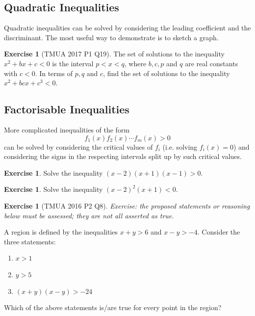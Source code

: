 \documentclass[11pt]{article}
\theoremstyle{definition}
\newtheorem{example}[theorem]{Exercise}
\theoremstyle{remark}
\newcommand{\pqty}[1]{\left(#1\right)}
\begin{document}
\subsection{Quadratic Inequalities}\label{tmua-1-subsection-008}
Quadratic inequalities can be solved by considering the leading coefficient and the discriminant. The most useful way to demonstrate is to sketch a graph.

\begin{example}[TMUA 2017 P1 Q19]\label{tmua-1-unit-021}
    The set of solutions to the inequality \(x^2 + bx + c < 0\) is the interval \(p < x < q\), where \(b, c, p\) and \(q\) are real constants with \(c < 0\). In terms of \(p, q\) and \(c\), find the set of solutions to the inequality \(x^2 + bcx + c^3 < 0\).
\end{example}

\subsection{Factorisable Inequalities}\label{tmua-1-subsection-009}
More complicated inequalities of the form
\[
    f_1\pqty{x} f_2\pqty{x} \cdots f_m\pqty{x} > 0
\]
can be solved by considering the critical values of \(f_i\) (i.e. solving \(f_i\pqty{x} = 0\)) and considering the signs in the respecting intervals split up by such critical values.

\begin{example}\label{tmua-1-unit-022}
    Solve the inequality \(\pqty{x - 2} \pqty{x + 1} \pqty{x - 1} > 0\).
\end{example}

\begin{example}\label{tmua-1-unit-023}
    Solve the inequality \(\pqty{x - 2}^2 \pqty{x + 1} < 0\).
\end{example}

\begin{example}[TMUA 2016 P2 Q8]\label{tmua-1-unit-024}
\textit{Exercise: the proposed statements or reasoning below must be assessed; they are not all asserted as true.}\par

    A region is defined by the inequalities \(x + y > 6\) and \(x - y > -4\). Consider the three statements:
    \begin{enumerate}
        \item \(x > 1\)
        \item \(y > 5\)
        \item \(\pqty{x + y} \pqty{x - y} > -24\)
    \end{enumerate}


    Which of the above statements is/are true for every point in the region?
\end{example}
\end{document}
